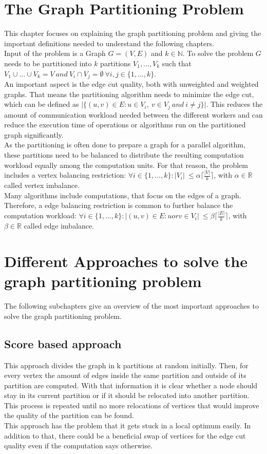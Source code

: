 \documentclass[acmsmall,nonacm,screen,review]{acmart}
\begin{document}
\section{The Graph Partitioning Problem}
This chapter focuses on explaining the graph partitioning problem and giving the important definitions needed to understand the following chapters.\\
Input of the problem is a Graph $G = (V,E)$ and $k\in \mathbb{N}$. To solve the problem $G$ needs to be partitioned into $k$ partitions $V_{1},...,V_{k}$ such that $V_{1}\cup...\cup V_{k} = V\ and\ V_{i}\cap V_{j} = \emptyset\ \forall i,j\in \{1,...,k\}$.\\
An important aspect is the edge cut quality, both with unweighted and weighted graphs. That means the partitioning algorithm needs to minimize the edge cut, which can be defined as $\vert \{(u,v)\in E : u\in V_{i},\ v\in V_{j}\ and\ i\neq j \}\vert$. This reduces the amount of communication workload needed between the different workers and can reduce the execution time of operations or algorithms run on the partitioned graph significantly.\\
As the partitioning is often done to prepare a graph for a parallel algorithm, these partitions need to be balanced to distribute the resulting computation workload equally among the computation units. For that reason, the problem includes a vertex balancing restriction: $\forall i\in \{1,...,k\} : \vert V_{i}\vert \ \leq \alpha \lceil \frac{\vert V \vert }{k} \rceil $, with $\alpha \in \mathbb{R}$ called vertex imbalance.\\
Many algorithms include computations, that focus on the edges of a graph. Therefore, a edge balancing restriction is common to further balance the computation workload: $\forall i\in \{1,...,k\} : \vert (u,v)\in E : u or v \in V_{i} \vert \ \leq \beta \lceil \frac{\vert E \vert }{k} \rceil $, with $\beta \in \mathbb{R}$ called edge imbalance.
\section{Different Approaches to solve the graph partitioning problem}
The following subchapters give an overview of the most important approaches to solve the graph partitioning problem.
\subsection{Score based approach}
This approach divides the graph in k partitions at random initially.
Then, for every vertex the amount of edges inside the same partition and outside of its partition are computed. With that information it is clear whether a node should stay in its current partition or if it should be relocated into another partition. This process is repeated until no more relocations of vertices that would improve the quality of the partition can be found.\\
This approach has the problem that it gets stuck in a local optimum easily. In addition to that, there could be a beneficial swap of vertices for the edge cut quality even if the computation says otherwise.
\end{document}

